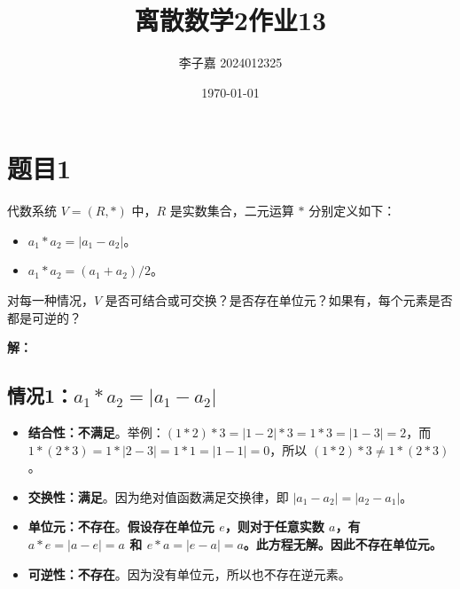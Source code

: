 \documentclass[utf8]{ctexart}
\title{\textbf{离散数学2\quad 作业13}}
\date{\today}
\author{李子嘉 2024012325}
\theoremstyle{mystyle}
\begin{document}
\maketitle

\section*{题目1}

\begin{problembox}
  代数系统 $V = (R, *) $ 中，$R$ 是实数集合，二元运算 $*$ 分别定义如下：
\begin{itemize}
  \item $a_1 * a_2 = |a_1 -a_2|$。
  \item $a_1 * a_2 = (a_1 + a_2) / 2$。
\end{itemize}
对每一种情况，$ V $ 是否可结合或可交换？是否存在单位元？如果有，每个元素是否都是可逆的？
\end{problembox}
\textbf{解：}
\subsection*{情况1：$a_1 * a_2 = |a_1 - a_2|$}
\begin{itemize}
  \item \textbf{结合性：不满足}。举例：$ (1 * 2) * 3 = |1 - 2| * 3 = 1 * 3 = |1 - 3| = 2 $，而 $ 1 * (2 * 3) = 1 * |2 - 3| = 1 * 1 = |1 - 1| = 0 $，所以 $ (1 * 2) * 3 \neq 1 * (2 * 3) $。
  
  \item \textbf{交换性：满足}。因为绝对值函数满足交换律，即 $ |a_1 - a_2| = |a_2 - a_1| $。
  
  \item \textbf{单位元：不存在}。\textcolor{critical}{\textbf{假设存在单位元 $e$，则对于任意实数 $a$，有 $a * e = |a - e| = a$ 和 $e * a = |e - a| = a$。此方程无解。因此不存在单位元。}}
  
  \item \textbf{可逆性：不存在}。因为没有单位元，所以也不存在逆元素。 
\end{itemize}
\end{document}
